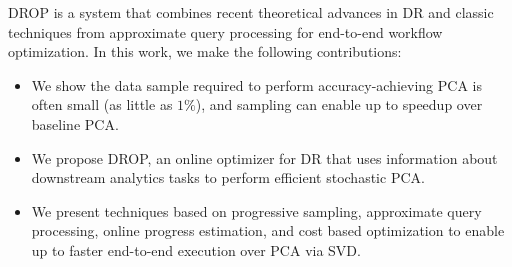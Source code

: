 DROP is a system that combines recent theoretical advances in DR and classic techniques from approximate query processing for end-to-end workflow optimization.
In this work, we make the following contributions:
\begin{itemize}

\item We show the data sample required to perform accuracy-achieving PCA is often small (as little as $1\%$), and sampling can enable up to \red{$91\times$} speedup over baseline PCA. 
  
\item We propose DROP, an online optimizer for DR that uses information about downstream analytics tasks to perform efficient stochastic PCA.

\item We present techniques based on progressive sampling, approximate query processing, online progress estimation, and cost based optimization to enable up to \red{$5\times$} faster end-to-end execution over PCA via SVD.%
\end{itemize}



